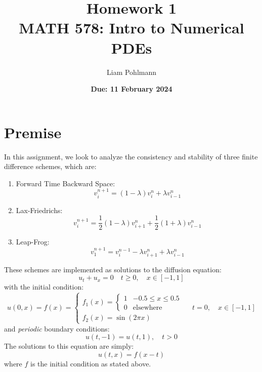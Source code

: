 \documentclass{math_hw}
\title{\textbf{Homework 1}\\ \vspace{1em}
MATH 578: Intro to Numerical PDEs}
\author[1]{Liam Pohlmann}
\affil[1]{University of New Mexico, Department of Nuclear Engineering}
\date{\textbf{Due: 11 February 2024}}
\theoremstyle{definition}
\begin{document}
    \maketitle
    \tableofcontents
    \clearpage


    \section*{Premise}
    In this assignment, we look to analyze the consistency and stability of three finite difference schemes, which are:
    \begin{enumerate}
        \item Forward Time Backward Space: \begin{equation}
                                               \tag{A} \label{scheme A}
                                               v^{n+1}_i = (1-\lambda)v_i^n+\lambda v_{i-1}^n
        \end{equation}
        \item Lax-Friedrichs: \begin{equation}
                                  \tag{B} \label{scheme B}
                                  v_i^{n+1} = \frac{1}{2}(1-\lambda)v_{i+1}^n + \frac{1}{2}(1+\lambda)v_{i-1}^n
        \end{equation}
        \item Leap-Frog: \begin{equation}
                             \tag{C} \label{scheme C}
                             v_1^{n+1} = v_i^{n-1}-\lambda v_{i+1}^n +\lambda v_{i-1}^n
        \end{equation}
    \end{enumerate}
    These schemes are implemented as solutions to the diffusion equation:
    \begin{equation}
        u_t +u_x = 0 \quad t\geq 0, \quad x\in [-1,1]
    \end{equation}
    with the initial condition:
    \begin{equation*}
        u(0,x) = f(x) = \begin{cases}
                            f_1(x) = \begin{cases}
                                         1& -0.5\leq x \leq 0.5 \\
                                         0 & \text{elsewhere}
                            \end{cases} \\
                            f_2(x) = \sin(2\pi x)
        \end{cases}
        \quad t=0,\quad x\in [-1,1]
    \end{equation*}
    and \textit{periodic} boundary conditions:
    \begin{equation*}
        u(t,-1)=u(t,1),\quad t>0
    \end{equation*}
    The solutions to this equation are simply:
    \begin{equation} \label{u_exact}
        u(t,x) = f(x-t)
    \end{equation}
    where $f$ is the initial condition as stated above.
\end{document}
